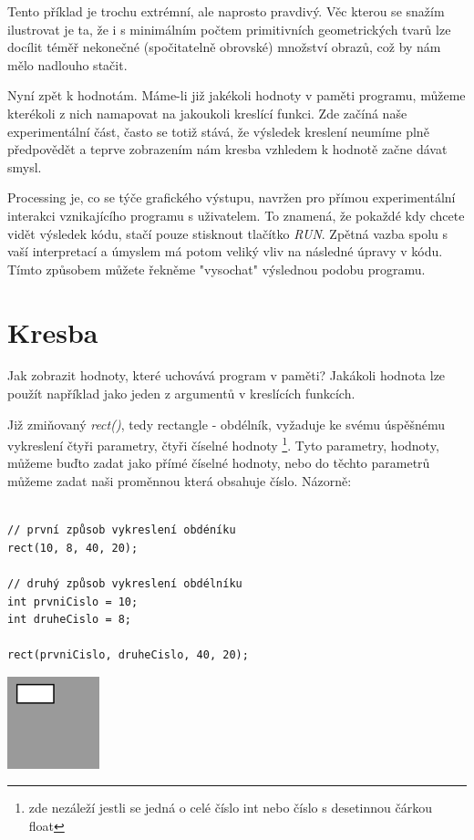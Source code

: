 \documentclass[10pt]{book}
\newcommand{\oddil}[1]{\section{#1}\index{#1}\label{#1}}
\newcommand{\vyraz}[1]{\textit{\gls{#1}}\index{#1}\label{#1}}
\begin{document}
Tento příklad je trochu extrémní, ale naprosto pravdivý. Věc kterou se snažím ilustrovat je ta, že i s minimálním počtem primitivních geometrických tvarů lze docílit téměř nekonečné (spočitatelně obrovské) množství obrazů, což by nám mělo nadlouho stačit.

Nyní zpět k hodnotám. Máme-li již jakékoli hodnoty v paměti programu, můžeme kterékoli z nich namapovat na jakoukoli kreslící funkci. Zde začíná naše experimentální část, často se totiž stává, že výsledek kreslení neumíme plně předpovědět a teprve zobrazením nám kresba vzhledem k hodnotě začne dávat smysl.

Processing je, co se týče grafického výstupu, navržen pro přímou experimentální interakci vznikajícího programu s uživatelem. To znamená, že pokaždé kdy chcete vidět výsledek kódu, stačí pouze stisknout tlačítko {\em RUN}. Zpětná vazba spolu s vaší interpretací a úmyslem má potom veliký vliv na následné úpravy v kódu. Tímto způsobem můžete řekněme "vysochat" výslednou podobu programu.

\oddil{Kresba}

Jak zobrazit hodnoty, které uchovává program v paměti? Jakákoli hodnota lze použít například jako jeden z argumentů v kreslících funkcích.

Již zmiňovaný \vyraz{rect()}, tedy rectangle - obdélník, vyžaduje ke svému úspěšnému vykreslení čtyři parametry, čtyři číselné hodnoty \footnote{zde nezáleží jestli se jedná o celé číslo int nebo číslo s desetinnou čárkou float}. Tyto parametry, hodnoty, můžeme buďto zadat jako přímé číselné hodnoty, nebo do těchto parametrů můžeme zadat naši proměnnou která obsahuje číslo. Názorně:

\begin{lstlisting}

// první způsob vykreslení obdéníku
rect(10, 8, 40, 20);

// druhý způsob vykreslení obdélníku
int prvniCislo = 10;
int druheCislo = 8;

rect(prvniCislo, druheCislo, 40, 20);

\end{lstlisting}


\begin{center}
\includegraphics[width = 0.2\textwidth]{imgs/kresba-1.png}
\end{center}
\end{document}
